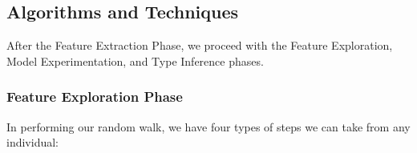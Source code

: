 \documentclass[runningheads,a4paper]{IEEEtran}
\begin{document}
\subsection{Algorithms and Techniques}
\label{algorithms}
%
After the Feature Extraction Phase, we proceed with the Feature Exploration, Model Experimentation, and Type Inference phases. 
\subsubsection{Feature Exploration Phase} 
\label{featureExplorationPhase}
In performing our random walk, we have four types of steps we can take from any individual:
\end{document}
